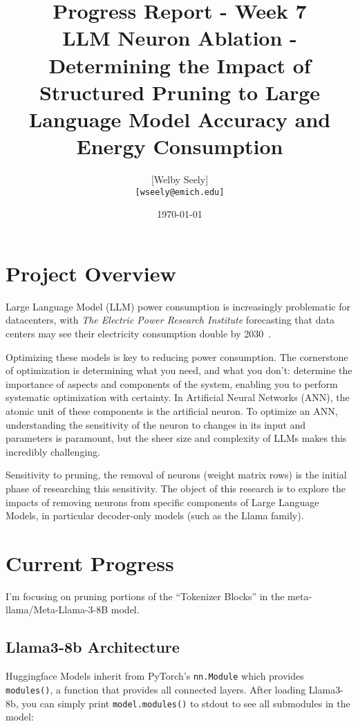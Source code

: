 \documentclass{article}
\title{Progress Report - Week 7 \\
\large LLM Neuron Ablation - Determining the Impact of Structured Pruning to Large Language Model Accuracy and Energy Consumption}
\author{
    [Welby Seely] \\
    \texttt{[wseely@emich.edu]}
}
\date{\today}
\begin{document}
    \maketitle


    \section{Project Overview}\label{sec:project-overview}
    Large Language Model (LLM) power consumption is increasingly problematic for datacenters, with \textit{The Electric Power
    Research Institute} forecasting that data centers may see their electricity consumption double by
    2030~\cite{kindig2024}.

    Optimizing these models is key to reducing power consumption.
    The cornerstone of optimization is determining what you need, and what you don't: determine the importance of
    aspects and components of the system, enabling you to perform systematic optimization with certainty.
    In Artificial Neural Networks (ANN), the atomic unit of these components is the artificial neuron.
    To optimize an ANN, understanding the sensitivity of the neuron to changes in its input and parameters is paramount,
    but the sheer size and complexity of LLMs makes this incredibly challenging.

    Sensitivity to pruning, the removal of neurons (weight matrix rows) is the initial phase of researching this sensitivity.
    The object of this research is to explore the impacts of removing neurons from specific components of Large Language Models, in particular decoder-only models (such as the Llama family).

    \section{Current Progress}\label{sec:current-progress}
    I'm focusing on pruning portions of the ``Tokenizer Blocks'' in the meta-llama/Meta-Llama-3-8B model.

    \subsection{Llama3-8b Architecture}\label{subsec:llama-3-architecture}

    Huggingface Models inherit from PyTorch's \texttt{nn.Module} which provides \texttt{modules()}, a function that provides all connected layers.
    After loading Llama3-8b, you can simply print \texttt{model.modules()} to stdout to see all submodules in the model:
\end{document}
